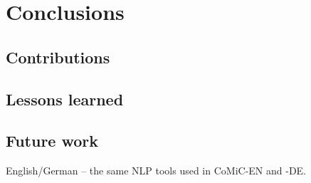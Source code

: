 
\chapter{Conclusions}

\section{Contributions}


\section{Lessons learned}


\section{Future work}
English/German -- the same NLP tools used in CoMiC-EN and -DE. \\

